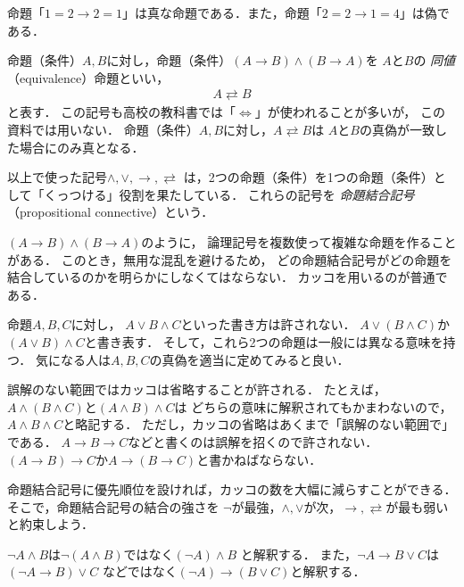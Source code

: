   \begin{ex}
    命題「$1=2 \to 2=1$」は真な命題である．また，命題「$2=2 \to 1=4$」は偽である．
  \end{ex}

  命題（条件）$A,  B$に対し，命題（条件）$(A \to B) \land ( B \to A) $を
  $A$と$B$の
  \emph{同値}（equivalence）命題といい，
  \begin{align}
    A \rightleftarrows B
    \label{eq:equivalence}
  \end{align}
  と表す．
  この記号も高校の教科書では「$\Longleftrightarrow$」が使われることが多いが，
  この資料では用いない．
  命題（条件）$A,  B$に対し，$A \rightleftarrows B$は
  $A$と$B$の真偽が一致した場合にのみ真となる．
  
  以上で使った記号$\land ,  \lor ,  \to ,  \rightleftarrows$
  は，2つの命題（条件）を1つの命題（条件）として「くっつける」役割を果たしている．
  これらの記号を
  \emph{命題結合記号}（propositional connective）という．
  
  $( A \to B) \land ( B \to A) $のように，
  論理記号を複数使って複雑な命題を作ることがある．
  このとき，無用な混乱を避けるため，
  どの命題結合記号がどの命題を結合しているのかを明らかにしなくてはならない．
  カッコを用いるのが普通である．
  \begin{ex}
    命題$A,  B,  C$に対し，
    $A \lor B \land C$といった書き方は許されない．
    $A \lor ( B \land C)$か$(A \lor B ) \land C$と書き表す．
    そして，これら2つの命題は一般には異なる意味を持つ．
    気になる人は$A,  B,  C$の真偽を適当に定めてみると良い．

    誤解のない範囲ではカッコは省略することが許される．
    たとえば，$A \land ( B \land C)$と$(A \land B)\land C$は
    どちらの意味に解釈されてもかまわないので，$A \land B \land C$と略記する．
    ただし，カッコの省略はあくまで「誤解のない範囲で」である．
    $A \to B \to C$などと書くのは誤解を招くので許されない．
    $( A \to B ) \to C$か$A \to ( B \to C)$と書かねばならない．
  \end{ex}
  
  命題結合記号に優先順位を設ければ，カッコの数を大幅に減らすことができる．
  そこで，命題結合記号の結合の強さを
  $\lnot$が最強，$\land,  \lor$が次，$\to ,  \rightleftarrows$が最も弱い
  と約束しよう．
  \begin{ex}
    $\lnot A \land B$は$\lnot( A \land B)$ではなく$(\lnot A ) \land B$
    と解釈する．
    また，$\lnot A \to B \lor C$は$(\lnot A \to B ) \lor C$
    などではなく$(\lnot A) \to ( B \lor C)$と解釈する．
  \end{ex}

